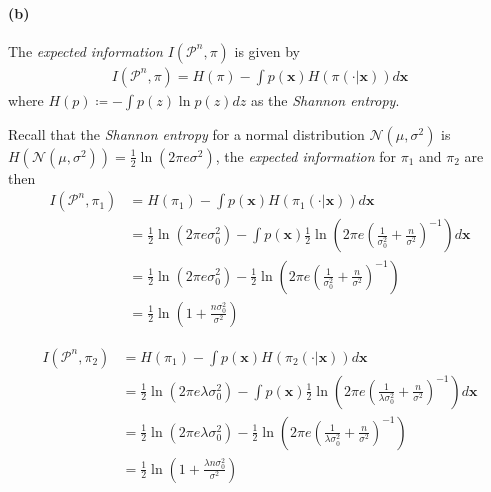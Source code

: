 \paragraph{(b)}
The \emph{expected information} $I(\mathcal{P}^n, \pi)$ is given by
\begin{align*}
    I(\mathcal{P}^n, \pi) = H(\pi) - \int p(\bm{x})H(\pi(\cdot \vert \bm{x}))d\bm{x}
\end{align*}
where $H(p) \coloneqq -\int p(z)\ln p(z)dz$ as the \emph{Shannon entropy}.

Recall that the \emph{Shannon entropy} for a normal distribution $\mathcal{N}(\mu, \sigma^2)$ is $H(\mathcal{N}(\mu, \sigma^2)) = \frac{1}{2}\ln (2\pi e \sigma^2)$, the \emph{expected information} for $\pi_1$ and $\pi_2$ are then
\begin{align*}
    I(\mathcal{P}^n, \pi_1) 
    &= H(\pi_1) - \int p(\bm{x})H(\pi_1(\cdot \vert \bm{x}))d\bm{x}\\
    &= \frac{1}{2}\ln (2\pi e \sigma_0^2) - 
        \int p(\bm{x}) \frac{1}{2}\ln \left( 2\pi e \left( \frac{1}{\sigma_0^2} + \frac{n}{\sigma^2} \right)^{-1} \right) d\bm{x}\\
    &= \frac{1}{2}\ln (2\pi e \sigma_0^2) - \frac{1}{2}\ln \left( 2\pi e \left( \frac{1}{\sigma_0^2} + \frac{n}{\sigma^2} \right)^{-1} \right) \\
    &= \frac{1}{2}\ln \left(1 + \frac{n\sigma_0^2}{\sigma^2} \right)
\end{align*}

\begin{align*}
    I(\mathcal{P}^n, \pi_2)
    &= H(\pi_1) - \int p(\bm{x})H(\pi_2(\cdot \vert \bm{x}))d\bm{x}\\
    &= \frac{1}{2}\ln (2\pi e \lambda \sigma_0^2) - 
        \int p(\bm{x}) \frac{1}{2}\ln \left( 2\pi e \left( \frac{1}{\lambda \sigma_0^2} + \frac{n}{\sigma^2} \right)^{-1} \right) d\bm{x}\\
    &= \frac{1}{2}\ln (2\pi e \lambda \sigma_0^2) - 
        \frac{1}{2}\ln \left( 2\pi e \left( \frac{1}{\lambda \sigma_0^2} + \frac{n}{\sigma^2} \right)^{-1} \right)\\
    &= \frac{1}{2}\ln \left(1 + \frac{\lambda n\sigma_0^2}{\sigma^2} \right)
\end{align*}

